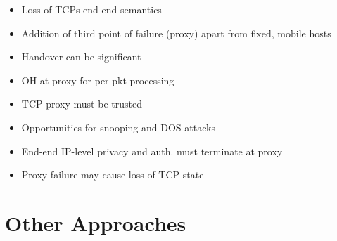 \documentclass[a4paper]{article}
\begin{document}
\begin{itemize}
	\item Loss of TCPs end-end semantics
	\item Addition of third point of failure (proxy) apart from fixed,
		mobile hosts
	\item Handover can be significant
	\item OH at proxy for per pkt processing
	\item TCP proxy must be trusted
	\item Opportunities for snooping and DOS attacks
	\item End-end IP-level privacy and auth. must terminate at proxy
	\item Proxy failure may cause loss of TCP state
\end{itemize}
\section{Other Approaches}
\end{document}
